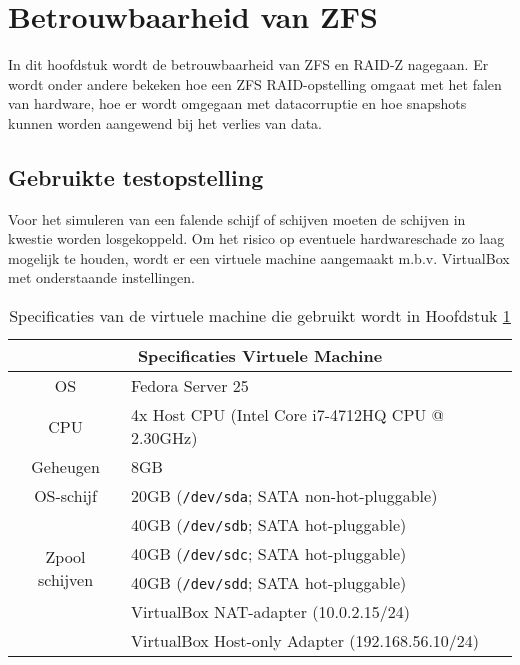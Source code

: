 

\chapter{Betrouwbaarheid van ZFS}
\label{ch:h9}

In dit hoofdstuk wordt de betrouwbaarheid van ZFS en RAID-Z nagegaan. Er wordt onder andere bekeken hoe een ZFS RAID-opstelling omgaat met het falen van hardware, hoe er wordt omgegaan met datacorruptie en hoe snapshots kunnen worden aangewend bij het verlies van data.

\section{Gebruikte testopstelling}

Voor het simuleren van een falende schijf of schijven moeten de schijven in kwestie worden losgekoppeld. Om het risico op eventuele hardwareschade zo laag mogelijk te houden, wordt er een virtuele machine aangemaakt m.b.v. VirtualBox met onderstaande instellingen.

\begin{table}[h]
  \centering
  \begin{tabular}{c l}
    \hline
    \multicolumn{2}{c}{\textbf{Specificaties Virtuele Machine}} \\
    \hline
    OS & Fedora Server 25 \\
    \hline
    CPU & 4x Host CPU (Intel Core i7-4712HQ CPU @ 2.30GHz) \\
    \hline
    Geheugen & 8GB \\
    \hline
    OS-schijf & 20GB (\texttt{/dev/sda}; SATA non-hot-pluggable) \\
    \hline
    \multirow{4}{*}{Zpool schijven} & 40GB (\texttt{/dev/sdb}; SATA hot-pluggable) \\
      & 40GB (\texttt{/dev/sdc}; SATA hot-pluggable) \\
      & 40GB (\texttt{/dev/sdd}; SATA hot-pluggable) \\
    \hline
    \multirow{2}{*}{NIC's} & VirtualBox NAT-adapter (10.0.2.15/24) \\
      & VirtualBox Host-only Adapter (192.168.56.10/24) \\
    \hline
  \end{tabular}
  \caption{Specificaties van de virtuele machine die gebruikt wordt in Hoofdstuk \ref{ch:h9}}
  \label{tab:specs_vm}
\end{table}

